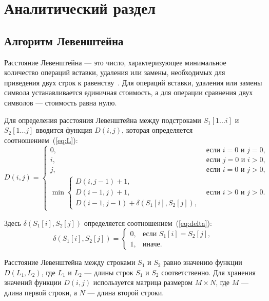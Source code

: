\chapter{Аналитический раздел}

\section{Алгоритм Левенштейна}
Расстояние Левенштейна — это число, характеризующее минимальное количество операций вставки, удаления или замены, необходимых для приведения двух строк к равенству~\cite{lev-def}. Для операций вставки, удаления или замены символа устанавливается единичная стоимость, а для операции сравнения двух символов — стоимость равна нулю.

Для определения расстояния Левенштейна между подстроками $S_1[1...i]$ и $S_2[1...j]$ вводится функция $D(i,j)$, которая определяется соотношением~(\ref{eq:L}):
\begin{equation}
	\label{eq:L}
	D(i, j) =
	\begin{cases}
		0, &\text{если } i = 0 \text{ и } j = 0, \\
		i, &\text{если } j = 0 \text{ и } i > 0, \\
		j, &\text{если } i = 0 \text{ и } j > 0, \\
		\min \begin{cases}
			D(i, j - 1) + 1, \\
			D(i - 1, j) + 1, \\
			D(i - 1, j - 1) +  \delta(S_{1}[i], S_{2}[j]),
		\end{cases}
		& \text{если } i > 0 \text{ и } j > 0.
	\end{cases}
\end{equation}

Здесь $\delta(S_1[i], S_2[j])$ определяется соотношением~(\ref{eq:delta}):
\begin{equation}
	\label{eq:delta}
	\delta(S_1[i], S_2[j]) = \begin{cases}
		0, & \text{если } S_1[i] = S_2[j], \\
		1, & \text{иначе}.
	\end{cases}
\end{equation}

Расстояние Левенштейна между строками $S_1$ и $S_2$ равно значению функции $D(L_1, L_2)$, где $L_1$ и $L_2$ — длины строк $S_1$ и $S_2$ соответственно. Для хранения значений функции $D(i,j)$ используется матрица размером $M \times N$, где $M$ — длина первой строки, а $N$ — длина второй строки.

